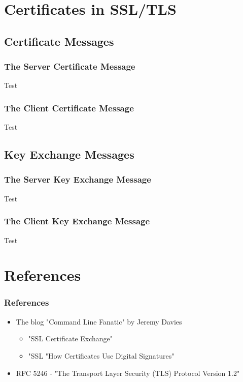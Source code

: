 \documentclass[aspectratio=169]{beamer}
\begin{document}
\section{Certificates in SSL/TLS}
\begin{frame}[Triangle=siiorange]
	\tocpage
\end{frame}
\subsection{Certificate Messages}
\begin{frame}[triangle=siiblue]
	\frametitle{The Server Certificate Message}
	Test
\end{frame}

\begin{frame}[triangle=siiblue]
	\frametitle{The Client Certificate Message}
	Test
\end{frame}

\subsection{Key Exchange Messages}
\begin{frame}[triangle=siiblue]
	\frametitle{The Server Key Exchange Message}
	Test
\end{frame}

\begin{frame}[triangle=siiblue]
	\frametitle{The Client Key Exchange Message}
	Test
\end{frame}


\section{References}
\begin{frame}[Triangle=siiorange]
	\tocpage
\end{frame}

\begin{frame}[triangle=siiblue]
	\frametitle{References}
	\begin{itemize}
		\item The blog "Command Line Fanatic" by Jeremy Davies
		\begin{itemize}
			\item "SSL Certificate Exchange"
			\item "SSL "How Certificates Use Digital Signatures"
		\end{itemize}		

		\vfill
		
		\item RFC 5246 - "The Transport Layer Security (TLS) Protocol Version 1.2"
	\end{itemize}
\end{frame}
\end{document}
